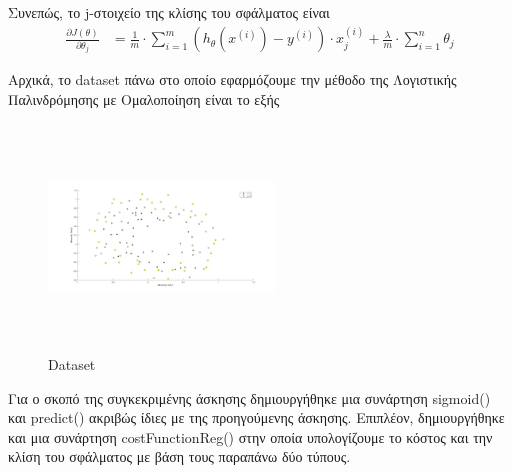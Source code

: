 \documentclass{article}
\begin{document}
	
	\noindent
	Συνεπώς, το j-στοιχείο της κλίσης του σφάλματος είναι
	\begin{align*}
		\frac{\partial J(θ)}{\partial θ_{j}} &= \frac{1}{m} \cdot \sum_{i=1}^{m} \left( h_{θ}(x^{(i)}) - y^{(i)} \right) \cdot x^{(i)}_{j} + \frac{λ}{m} \cdot \sum_{i=1}^{n}  θ_{j}
	\end{align*}
	
	\noindent
	Aρχικά, το dataset πάνω στο οποίο εφαρμόζουμε την μέθοδο της Λογιστικής Παλινδρόμησης με Ομαλοποίηση είναι το εξής
	\begin{figure}[h!]
		\centering
		\includegraphics[height=6cm,width=6cm]{../exercise2_2/images/ex2_dataset.png}
		\caption{Dataset}
	\end{figure}

	\noindent
	Για ο σκοπό της συγκεκριμένης άσκησης δημιουργήθηκε μια συνάρτηση sigmoid() και predict() ακριβώς ίδιες με της προηγούμενης άσκησης. Επιπλέον, δημιουργήθηκε και μια συνάρτηση costFunctionReg() στην οποία υπολογίζουμε το κόστος και την κλίση του σφάλματος με βάση τους παραπάνω δύο τύπους.
	
\end{document}
